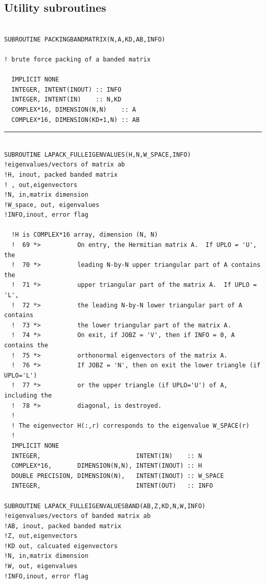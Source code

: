 \documentclass[10pt,a4paper]{article}
\begin{document}
\subsection{Utility subroutines}
\begin{verbatim}

SUBROUTINE PACKINGBANDMATRIX(N,A,KD,AB,INFO)

! brute force packing of a banded matrix
  
  IMPLICIT NONE
  INTEGER, INTENT(INOUT) :: INFO
  INTEGER, INTENT(IN)    :: N,KD
  COMPLEX*16, DIMENSION(N,N)    :: A
  COMPLEX*16, DIMENSION(KD+1,N) :: AB
\end{verbatim}
\begin{center}
\rule{12cm}{1pt}
\end{center}
\begin{verbatim}

SUBROUTINE LAPACK_FULLEIGENVALUES(H,N,W_SPACE,INFO)
!eigenvalues/vectors of matrix ab
!H, inout, packed banded matrix
! , out,eigenvectors
!N, in,matrix dimension
!W_space, out, eigenvalues
!INFO,inout, error flag

  !H is COMPLEX*16 array, dimension (N, N)
  !  69 *>          On entry, the Hermitian matrix A.  If UPLO = 'U', the
  !  70 *>          leading N-by-N upper triangular part of A contains the
  !  71 *>          upper triangular part of the matrix A.  If UPLO = 'L',
  !  72 *>          the leading N-by-N lower triangular part of A contains
  !  73 *>          the lower triangular part of the matrix A.
  !  74 *>          On exit, if JOBZ = 'V', then if INFO = 0, A contains the
  !  75 *>          orthonormal eigenvectors of the matrix A.
  !  76 *>          If JOBZ = 'N', then on exit the lower triangle (if UPLO='L')
  !  77 *>          or the upper triangle (if UPLO='U') of A, including the
  !  78 *>          diagonal, is destroyed.
  !
  ! The eigenvector H(:,r) corresponds to the eigenvalue W_SPACE(r)
  !
  IMPLICIT NONE
  INTEGER,                          INTENT(IN)    :: N
  COMPLEX*16,       DIMENSION(N,N), INTENT(INOUT) :: H
  DOUBLE PRECISION, DIMENSION(N),   INTENT(INOUT) :: W_SPACE
  INTEGER,                          INTENT(OUT)   :: INFO

SUBROUTINE LAPACK_FULLEIGENVALUESBAND(AB,Z,KD,N,W,INFO)
!eigenvalues/vectors of banded matrix ab
!AB, inout, packed banded matrix
!Z, out,eigenvectors
!KD out, calcuated eigenvectors
!N, in,matrix dimension
!W, out, eigenvalues
!INFO,inout, error flag


\end{verbatim}
\end{document}

